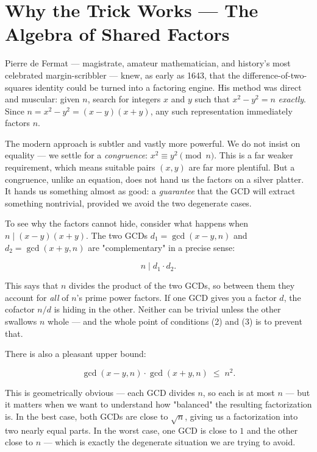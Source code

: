 \documentclass[11pt,openright,twoside]{book}
\theoremstyle{definition}
\begin{document}
\bigskip


\section{Why the Trick Works — The Algebra of Shared Factors}

Pierre de Fermat --- magistrate, amateur mathematician, and history's most celebrated margin-scribbler --- knew, as early as 1643, that the difference-of-two-squares identity could be turned into a factoring engine. His method was direct and muscular: given $n$, search for integers $x$ and $y$ such that $x^2 - y^2 = n$ \textit{exactly}. Since $n = x^2 - y^2 = (x - y)(x + y)$, any such representation immediately factors $n$.

The modern approach is subtler and vastly more powerful. We do not insist on equality --- we settle for a \textit{congruence}: $x^2 \equiv y^2 \pmod{n}$. This is a far weaker requirement, which means suitable pairs $(x, y)$ are far more plentiful. But a congruence, unlike an equation, does not hand us the factors on a silver platter. It hands us something almost as good: a \textit{guarantee} that the GCD will extract something nontrivial, provided we avoid the two degenerate cases.

To see why the factors cannot hide, consider what happens when $n \mid (x - y)(x + y)$. The two GCDs $d_1 = \gcd(x - y, n)$ and $d_2 = \gcd(x + y, n)$ are "complementary" in a precise sense:

\[n \;\Big|\; d_1 \cdot d_2.\]

This says that $n$ divides the product of the two GCDs, so between them they account for \textit{all} of $n$'s prime power factors. If one GCD gives you a factor $d$, the cofactor $n / d$ is hiding in the other. Neither can be trivial unless the other swallows $n$ whole --- and the whole point of conditions (2) and (3) is to prevent that.

There is also a pleasant upper bound:

\[\gcd(x - y, n) \cdot \gcd(x + y, n) \;\leq\; n^2.\]

This is geometrically obvious --- each GCD divides $n$, so each is at most $n$ --- but it matters when we want to understand how "balanced" the resulting factorization is. In the best case, both GCDs are close to $\sqrt{n}$, giving us a factorization into two nearly equal parts. In the worst case, one GCD is close to $1$ and the other close to $n$ --- which is exactly the degenerate situation we are trying to avoid.
\end{document}
